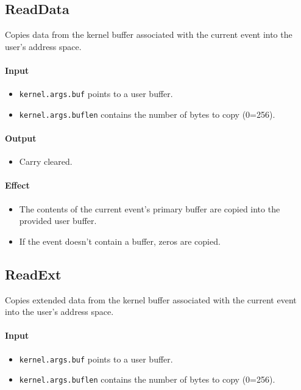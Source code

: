 \subsection*{ReadData}
Copies data from the kernel buffer associated with the current event into the user's address space.

\paragraph{Input}
\begin{itemize}
\item \verb+kernel.args.buf+ points to a user buffer.
\item \verb+kernel.args.buflen+ contains the number of bytes to copy (0=256).
\end{itemize}

\paragraph{Output}
\begin{itemize}
\item Carry cleared.
\end{itemize}

\paragraph{Effect}
\begin{itemize}
\item The contents of the current event's primary buffer are copied into the provided user buffer.
\item If the event doesn't contain a buffer, zeros are copied.
\end{itemize}

\subsection*{ReadExt}
Copies extended data from the kernel buffer associated with the current event into the user's address space.

\paragraph{Input}
\begin{itemize} 
\item \verb+kernel.args.buf+ points to a user buffer.
\item \verb+kernel.args.buflen+ contains the number of bytes to copy (0=256).
\end{itemize}

